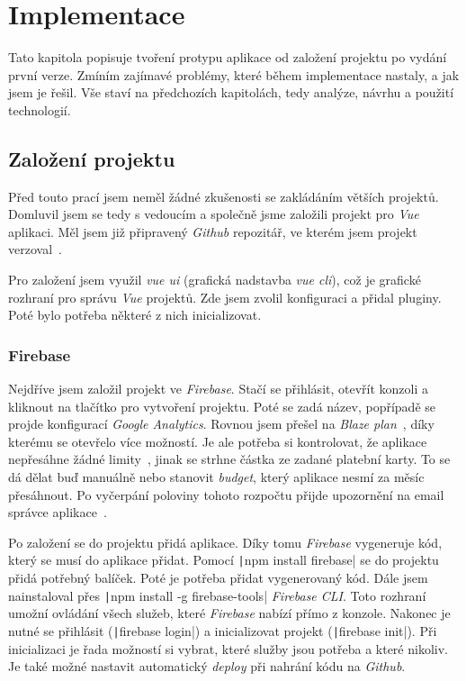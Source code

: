 
\chapter{Implementace}
Tato kapitola popisuje tvoření protypu aplikace od založení projektu po vydání první verze. Zmíním zajímavé problémy,
které během implementace nastaly, a jak jsem je řešil. Vše staví na předchozích kapitolách, tedy analýze, návrhu a použití
technologií.

\section{Založení projektu}
Před touto prací jsem neměl žádné zkušenosti se zakládáním větších projektů. Domluvil jsem se tedy s vedoucím a společně
jsme založili projekt pro \emph{Vue} aplikaci. Měl jsem již připravený \emph{Github} repozitář, ve kterém jsem projekt
verzoval~\cite{GithubAbout}.

Pro založení jsem využil \emph{vue ui} (grafická nadstavba \emph{vue cli}), což je grafické rozhraní pro správu \emph{Vue} projektů.
Zde jsem zvolil konfiguraci a přidal pluginy. Poté bylo potřeba některé z nich inicializovat.

\subsection{Firebase}
Nejdříve jsem založil projekt ve \emph{Firebase}. Stačí se přihlásit, otevřít konzoli a kliknout na tlačítko pro vytvoření projektu.
Poté se zadá název, popřípadě se projde konfigurací \emph{Google Analytics}. Rovnou jsem přešel na \emph{Blaze plan}~\cite{FirebasePricing}, díky kterému
se otevřelo více možností. Je ale potřeba si kontrolovat, že aplikace nepřesáhne žádné limity~\cite{FirebaseLimits}, jinak se strhne
částka ze zadané platební karty. To se dá dělat buď manuálně nebo stanovit \emph{budget}, který aplikace nesmí za měsíc přesáhnout.
Po vyčerpání poloviny tohoto rozpočtu přijde upozornění na email správce aplikace~\cite{FirebaseBudget}.

Po založení se do projektu přidá aplikace. Díky tomu \emph{Firebase} vygeneruje kód, který se musí do aplikace přidat.
Pomocí \texttt|npm install firebase| se do projektu přidá potřebný balíček. Poté je potřeba přidat vygenerovaný
kód. Dále jsem nainstaloval přes \texttt|npm install -g firebase-tools| \emph{Firebase CLI}. Toto rozhraní umožní
ovládání všech služeb, které \emph{Firebase} nabízí přímo z konzole. Nakonec je nutné se přihlásit (\texttt|firebase login|) a %
inicializovat projekt (\texttt|firebase init|). Při inicializaci je řada možností si vybrat, které služby jsou potřeba
a které nikoliv. Je také možné nastavit automatický \emph{deploy} při nahrání kódu na \emph{Github}.

